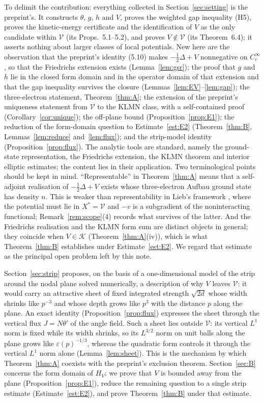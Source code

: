 \documentclass[11pt,a4paper]{article}
\theoremstyle{plain}
\theoremstyle{definition}
\theoremstyle{remark}
\newcommand{\VV}{\mathcal{V}}
\newcommand{\KK}{\mathcal{K}}
\begin{document}
To delimit the contribution: everything collected in Section~\ref{sec:setting} is the preprint's. It constructs $\theta$, $g$, $h$ and $V$, proves the weighted gap inequality (H5), proves the kinetic-energy certificate and the identification of $V$ as the only candidate within $\VV$ (its Props.~5.1--5.2), and proves $V\notin\VV$ (its Theorem~6.4); it asserts nothing about larger classes of local potentials. New here are the observation that the preprint's identity (5.10) makes $-\tfrac12\Delta+V$ nonnegative on $C_c^\infty$, so that the Friedrichs extension exists (Lemma~\ref{lem:gsr}); the proof that $g$ and $h$ lie in the closed form domain and in the operator domain of that extension and that the gap inequality survives the closure (Lemmas~\ref{lem:EV}--\ref{lem:gap}); the three-electron statement, Theorem~\ref{thm:A}; the extension of the preprint's uniqueness statement from $\VV$ to the KLMN class, with a self-contained proof (Corollary~\ref{cor:unique}); the off-plane bound (Proposition~\ref{prop:E1}); the reduction of the form-domain question to Estimate~\ref{est:E2} (Theorem~\ref{thm:B}, Lemmas~\ref{lem:reduce} and~\ref{lem:flux}); and the strip-model identity (Proposition~\ref{prop:flux}). The analytic tools are standard, namely the ground-state representation, the Friedrichs extension, the KLMN theorem and interior elliptic estimates; the content lies in their application. Two terminological points should be kept in mind. ``Representable'' in Theorem~\ref{thm:A} means that a self-adjoint realisation of $-\tfrac12\Delta+V$ exists whose three-electron Aufbau ground state has density $n$. This is weaker than representability in Lieb's framework \cite{Lieb83}, where the potential must lie in $X^*=\VV$ and $-v$ is a subgradient of the noninteracting functional; Remark~\ref{rem:scope}(4) records what survives of the latter. And the Friedrichs realisation and the KLMN form sum are distinct objects in general; they coincide when $V\in\KK$ (Theorem~\ref{thm:A}(iv)), which is what Theorem~\ref{thm:B} establishes under Estimate~\ref{est:E2}. We regard that estimate as the principal open problem left by this note.

Section~\ref{sec:strip} proposes, on the basis of a one-dimensional model of the strip around the nodal plane solved numerically, a description of why $V$ leaves $\VV$: it would carry an attractive sheet of fixed integrated strength $\sqrt{2d}$ whose width shrinks like $p^{-3}$ and whose depth grows like $p^{3}$ with the distance $p$ along the plane. An exact identity (Proposition~\ref{prop:flux}) expresses the sheet through the vertical flux $J=N\theta'$ of the angle field. Such a sheet lies outside $\VV$: its vertical $L^1$ norm is fixed while its width shrinks, so its $L^{3/2}$ norm on unit balls along the plane grows like $\varepsilon(p)^{-1/3}$, whereas the quadratic form controls it through the vertical $L^1$ norm alone (Lemma~\ref{lem:sheet}). This is the mechanism by which Theorem~\ref{thm:A} coexists with the preprint's exclusion theorem. Section~\ref{sec:B} concerns the form domain of $H_V$: we prove that $V$ is bounded away from the plane (Proposition~\ref{prop:E1}), reduce the remaining question to a single strip estimate (Estimate~\ref{est:E2}), and prove Theorem~\ref{thm:B} under that estimate.
\end{document}
